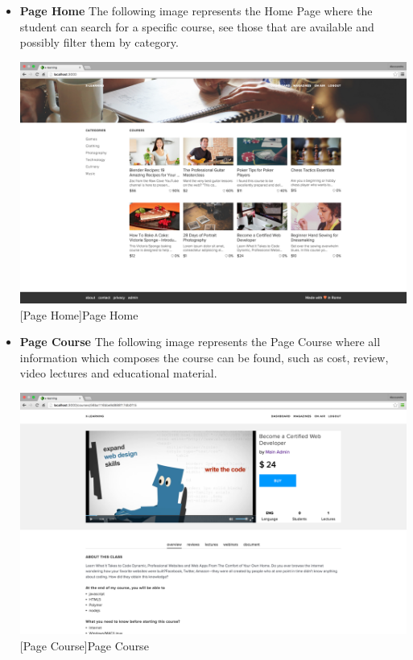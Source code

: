 \begin{itemize}

\item \textbf{Page Home} The following image represents the Home Page where the student can search for a specific course, see those that are available and possibly filter them by category.\par

\begin{minipage}{\linewidth}
    \centering
    \includegraphics[width=0.9\linewidth]{images/chapter4/page-home.png}
    [Page Home]{Page Home}
\end{minipage}


\item \textbf{Page Course} The following image represents the Page Course where all information which composes the course can be found, such as cost, review, video lectures and educational material.
\\
\par

\begin{minipage}{\linewidth}
    \centering
    \includegraphics[width=0.9\linewidth]{images/chapter4/page-course.png}
    [Page Course]{Page Course}
\end{minipage}



\end{itemize}
